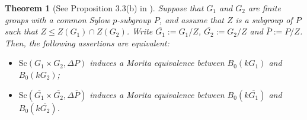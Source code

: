 \documentclass[12pt,a4paper]{amsart}
\theoremstyle{plain}\newtheorem{Theorem}{Theorem}[section]
\theoremstyle{plain}\newtheorem{Conjecture}[Theorem]{Conjecture}
\theoremstyle{plain}\newtheorem{Corollary}[Theorem]{Corollary}
\theoremstyle{plain}\newtheorem{Lemma}[Theorem]{Lemma}
\theoremstyle{plain}\newtheorem{Proposition}[Theorem]{Proposition}
\theoremstyle{definition}\newtheorem{Definition}[Theorem]{Definition}
\theoremstyle{definition}\newtheorem{Example}[Theorem]{Example}
\theoremstyle{definition}\newtheorem{Examples}[Theorem]{Examples}
\theoremstyle{definition}\newtheorem{Remark}[Theorem]{Remark}
\theoremstyle{definition}\newtheorem{Question}[Theorem]{Question}
\theoremstyle{definition}\newtheorem{Notation}[Theorem]{Notation}
\theoremstyle{definition}\newtheorem{Hypothesis}[Theorem]{Hypothesis}
\theoremstyle{definition}\newtheorem{Assumption}[Theorem]{Assumption}
\theoremstyle{definition}\newtheorem{Strategy}[Theorem]{Strategy}
\theoremstyle{definition}\newtheorem{Contents}[Theorem]{Contents}
\theoremstyle{definition}\newtheorem{Computations}[Theorem]{Computations}
\theoremstyle{definition}\newtheorem{Equivalences}[Theorem]{Equivalences}
\theoremstyle{definition}\newtheorem{Notation/Definition}[Theorem]{Notation/Definition}
\theoremstyle{definition}\newtheorem{noth}[Theorem]{}
\theoremstyle{plain}\newtheorem{Step}[Theorem]{Step}
\begin{document}
\begin{Theorem}[{}{See Proposition 3.3(b) in \cite{KL20b}}]\label{Prop3.3}\label{thm:ScottFor_G-G/Z}
Suppose that $G_1$ and $G_2$ are finite groups with a common Sylow $p$-subgroup $P$,
and assume that 
$Z$ is a subgroup of $P$ such that $Z\leq Z(G_1)\cap Z(G_2)$. Write $\overline{G_1}:=G_1/Z$,
$\overline{G_2}:=G_2/Z$ and $\overline P:=P/Z$.  
Then, the following assertions are equivalent:
   \begin{itemize}
\item[\rm(i)] ${\mathrm{Sc}}(G_1\times G_2,\Delta P)$ induces a Morita equivalence 
between $B_0(kG_1)$ and $B_0(kG_2)$;
\item[\rm(ii)] ${\mathrm{Sc}}(\overline{G_1}\times\overline{G_2}, \Delta \overline P)$  
induces a Morita equivalence between $B_0(k\overline{G_1})$ and $B_0(k\overline{G_2})$.
   \end{itemize}
\end{Theorem}
%
\end{document}
